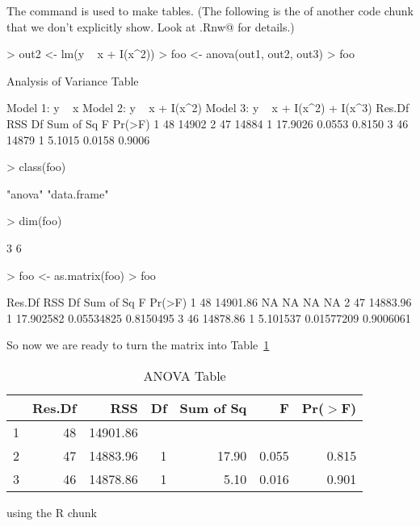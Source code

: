 \documentclass{article}
\begin{document}
The \verb@xtable@ command is used to make tables.  (The following
is the \verb@Sweave@ of another code chunk that we don't explicitly
show.  Look at \verb@foo.Rnw@ for details.)
\begin{Schunk}
\begin{Sinput}
> out2 <- lm(y ~ x + I(x^2))
> foo <- anova(out1, out2, out3)
> foo
\end{Sinput}
\begin{Soutput}
Analysis of Variance Table

Model 1: y ~ x
Model 2: y ~ x + I(x^2)
Model 3: y ~ x + I(x^2) + I(x^3)
  Res.Df   RSS Df Sum of Sq      F Pr(>F)
1     48 14902                           
2     47 14884  1   17.9026 0.0553 0.8150
3     46 14879  1    5.1015 0.0158 0.9006
\end{Soutput}
\begin{Sinput}
> class(foo)
\end{Sinput}
\begin{Soutput}
[1] "anova"      "data.frame"
\end{Soutput}
\begin{Sinput}
> dim(foo)
\end{Sinput}
\begin{Soutput}
[1] 3 6
\end{Soutput}
\begin{Sinput}
> foo <- as.matrix(foo)
> foo
\end{Sinput}
\begin{Soutput}
  Res.Df      RSS Df Sum of Sq          F    Pr(>F)
1     48 14901.86 NA        NA         NA        NA
2     47 14883.96  1 17.902582 0.05534825 0.8150495
3     46 14878.86  1  5.101537 0.01577209 0.9006061
\end{Soutput}
\end{Schunk}
So now we are ready to turn the matrix \verb@foo@
into Table~\ref{tab:one}
\begin{table}[tbp]
\begin{center}
\caption{ANOVA Table}
\label{tab:one}
\begin{tabular}{rrrrrrr}
  \hline
 & Res.Df & RSS & Df & Sum of Sq & F & Pr($>$F) \\ 
  \hline
1 & 48 & 14901.86 &  &  &  &  \\ 
  2 & 47 & 14883.96 & 1 & 17.90 & 0.055 & 0.815 \\ 
  3 & 46 & 14878.86 & 1 & 5.10 & 0.016 & 0.901 \\ 
   \hline
\end{tabular}
\end{center}
\end{table}using the R chunk
\end{document}
